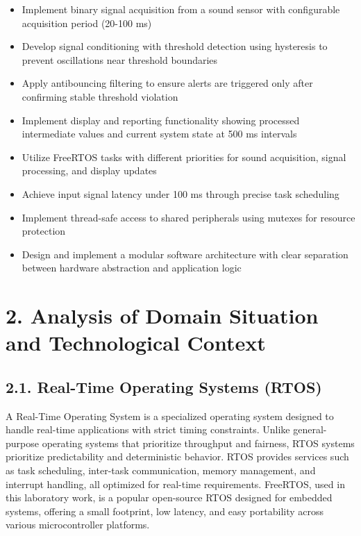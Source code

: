 \documentclass[12pt]{article}
\begin{document}
\begin{itemize}
    \item Implement binary signal acquisition from a sound sensor with configurable acquisition period (20-100 ms)
    \item Develop signal conditioning with threshold detection using hysteresis to prevent oscillations near threshold boundaries
    \item Apply antibouncing filtering to ensure alerts are triggered only after confirming stable threshold violation
    \item Implement display and reporting functionality showing processed intermediate values and current system state at 500 ms intervals
    \item Utilize FreeRTOS tasks with different priorities for sound acquisition, signal processing, and display updates
    \item Achieve input signal latency under 100 ms through precise task scheduling
    \item Implement thread-safe access to shared peripherals using mutexes for resource protection
    \item Design and implement a modular software architecture with clear separation between hardware abstraction and application logic
\end{itemize}

\section*{2. Analysis of Domain Situation and Technological Context}

\subsection*{2.1. Real-Time Operating Systems (RTOS)}

A Real-Time Operating System is a specialized operating system designed to handle real-time applications with strict timing constraints. Unlike general-purpose operating systems that prioritize throughput and fairness, RTOS systems prioritize predictability and deterministic behavior. RTOS provides services such as task scheduling, inter-task communication, memory management, and interrupt handling, all optimized for real-time requirements. FreeRTOS, used in this laboratory work, is a popular open-source RTOS designed for embedded systems, offering a small footprint, low latency, and easy portability across various microcontroller platforms.
\end{document}
